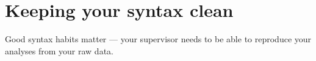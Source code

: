 \documentclass[
  11pt,
  a4paper,
]{scrbook}
\newenvironment{Shaded}{\begin{snugshade}}{\end{snugshade}}
\newcommand{\AttributeTok}[1]{\textcolor[rgb]{0.40,0.45,0.13}{#1}}
\newcommand{\CommentTok}[1]{\textcolor[rgb]{0.37,0.37,0.37}{#1}}
\newcommand{\FunctionTok}[1]{\textcolor[rgb]{0.28,0.35,0.67}{#1}}
\newcommand{\NormalTok}[1]{\textcolor[rgb]{0.00,0.23,0.31}{#1}}
\newcommand{\OtherTok}[1]{\textcolor[rgb]{0.00,0.23,0.31}{#1}}
\newcommand{\SpecialCharTok}[1]{\textcolor[rgb]{0.37,0.37,0.37}{#1}}
\begin{document}
\begin{Shaded}
\end{Shaded}

\section{Keeping your syntax clean}\label{keeping-your-syntax-clean}

Good syntax habits matter --- your supervisor needs to be able to
reproduce your analyses from your raw data.
\end{document}

